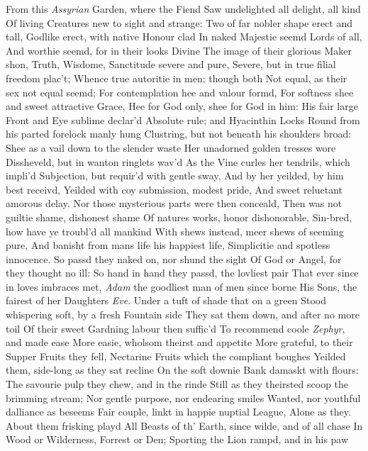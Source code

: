 \documentclass[11pt]{book}
\begin{document}
From this \textit{Assyrian} Garden, where the Fiend 
Saw undelighted all delight, all kind 
Of living Creatures new to sight and strange: 
Two of far nobler shape erect and tall, 
Godlike erect, with native Honour clad 
In naked Majestie seemd Lords of all, 
And worthie seemd, for in their looks Divine 
The image of their glorious Maker shon, 
Truth, Wisdome, Sanctitude severe and pure, 
Severe, but in true filial freedom plac't; 
Whence true autoritie in men; though both 
Not equal, as their sex not equal seemd; 
For contemplation hee and valour formd, 
For softness shee and sweet attractive Grace, 
Hee for God only, shee for God in him: 
His fair large Front and Eye sublime declar'd 
Absolute rule; and Hyacinthin Locks 
Round from his parted forelock manly hung 
Clustring, but not beneath his shoulders broad: 
Shee as a vail down to the slender waste 
Her unadorned golden tresses wore 
Dissheveld, but in wanton ringlets wav'd 
As the Vine curles her tendrils, which impli'd 
Subjection, but requir'd with gentle sway, 
And by her yeilded, by him best receivd, 
Yeilded with coy submission, modest pride, 
And sweet reluctant amorous delay. 
Nor those mysterious parts were then conceald, 
Then was not guiltie shame, dishonest shame 
Of natures works, honor dishonorable, 
Sin-bred, how have ye troubl'd all mankind 
With shews instead, meer shews of seeming pure, 
And banisht from mans life his happiest life, 
Simplicitie and spotless innocence. 
So passd they naked on, nor shund the sight 
Of God or Angel, for they thought no ill: 
So hand in hand they passd, the lovliest pair 
That ever since in loves imbraces met, 
\textit{Adam} the goodliest man of men since borne 
His Sons, the fairest of her Daughters \textit{Eve}. 
Under a tuft of shade that on a green 
Stood whispering soft, by a fresh Fountain side 
They sat them down, and after no more toil 
Of their sweet Gardning labour then suffic'd 
To recommend coole \textit{Zephyr}, and made ease 
More easie, wholsom theirst and appetite 
More grateful, to their Supper Fruits they fell, 
Nectarine Fruits which the compliant boughes 
Yeilded them, side-long as they sat recline 
On the soft downie Bank damaskt with flours: 
The savourie pulp they chew, and in the rinde 
Still as they theirsted scoop the brimming stream; 
Nor gentle purpose, nor endearing smiles 
Wanted, nor youthful dalliance as beseems 
Fair couple, linkt in happie nuptial League, 
Alone as they.  About them frisking playd 
All Beasts of th' Earth, since wilde, and of all chase 
In Wood or Wilderness, Forrest or Den; 
Sporting the Lion rampd, and in his paw 
\end{document}
